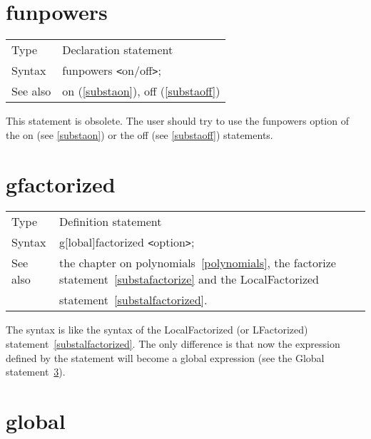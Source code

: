 
\section{funpowers}
\label{substafunpowers}

\noindent \begin{tabular}{ll}
Type & Declaration statement\\
Syntax & funpowers {\tt<}on/off{\tt>};
\\ See also & on (\ref{substaon}), off (\ref{substaoff})
\end{tabular} \vspace{4mm}

\noindent This statement is obsolete. The 
user should try to use the funpowers option of the on (see 
\ref{substaon}) or the off (see \ref{substaoff}) statements. 
\vspace{10mm}


\section{gfactorized}
\label{substagfactorized}

\noindent \begin{tabular}{ll}
Type & Definition statement\\
Syntax & g[lobal]factorized {\tt<}option{\tt>};
\\ See also & the chapter on polynomials~\ref{polynomials}, the 
factorize statement~\ref{substafactorize} and the LocalFactorized \\ &
statement~\ref{substalfactorized}.\hfill
\end{tabular}
\smallskip

\noindent The syntax is like the syntax of the LocalFactorized (or 
LFactorized) statement~\ref{substalfactorized}. The only difference is that 
now the expression defined by the statement will become a global 
expression (see the Global statement~\ref{substaglobal}).
\vspace{10mm}


\section{global}
\label{substaglobal}

